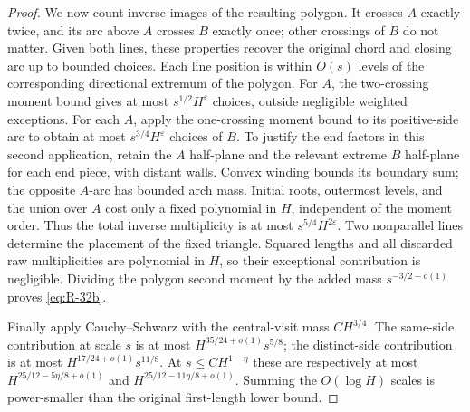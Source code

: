 \begin{proof}
We now count inverse images of the resulting polygon. It crosses \(A\)
exactly twice, and its arc above \(A\) crosses \(B\) exactly once;
other crossings of \(B\) do not matter. Given both lines, these properties
recover the original chord and closing arc up to bounded choices. Each
line position is within \(O(s)\) levels of the corresponding directional
extremum of the polygon. For \(A\), the two-crossing moment bound gives
at most \(s^{1/2}H^\varepsilon\) choices, outside negligible weighted
exceptions. For each \(A\), apply the one-crossing moment bound to its
positive-side arc to obtain at most \(s^{3/4}H^\varepsilon\) choices
of \(B\). To justify the end factors in this second application, retain
the \(A\) half-plane and the relevant extreme \(B\) half-plane for
each end piece, with distant walls. Convex winding bounds its boundary
sum; the opposite \(A\)-arc has bounded arch mass. Initial roots,
outermost levels, and the union over \(A\) cost only a fixed polynomial
in \(H\), independent of the moment order. Thus the total inverse
multiplicity is at most \(s^{5/4}H^{2\varepsilon}\). Two nonparallel
lines determine the placement of the fixed triangle. Squared lengths and
all discarded raw multiplicities are polynomial in \(H\), so their
exceptional contribution is negligible. Dividing the polygon second
moment by the added mass \(s^{-3/2-o(1)}\) proves
\eqref{eq:R-32b}.

Finally apply Cauchy--Schwarz with the central-visit mass \(CH^{3/4}\).
The same-side contribution at scale \(s\) is at most
\(H^{35/24+o(1)}s^{5/8}\); the distinct-side contribution is at most
\(H^{17/24+o(1)}s^{11/8}\). At \(s\le CH^{1-\eta}\) these are
respectively at most
\(H^{25/12-5\eta/8+o(1)}\) and
\(H^{25/12-11\eta/8+o(1)}\). Summing the \(O(\log H)\) scales is
power-smaller than the original first-length lower bound.
\end{proof}

